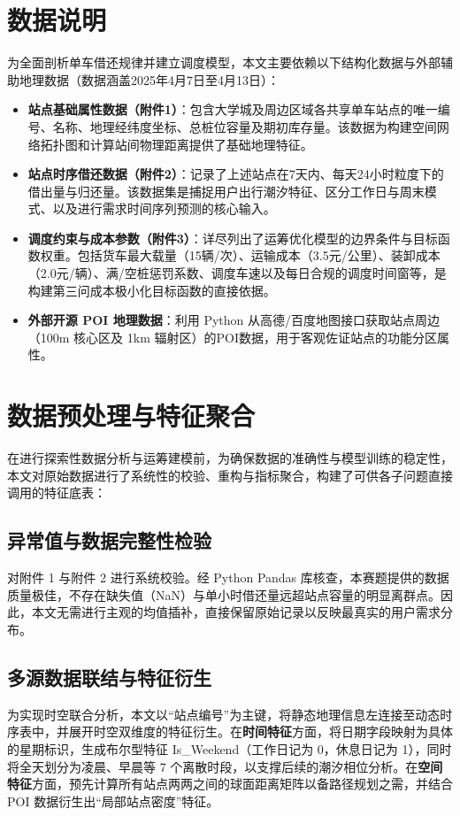 \documentclass[a4paper, 12pt]{ctexart}
\begin{document}
\section{数据说明} 
为全面剖析单车借还规律并建立调度模型，本文主要依赖以下结构化数据与外部辅助地理数据（数据涵盖2025年4月7日至4月13日）：
\begin{itemize}
    \item \textbf{站点基础属性数据（附件1）}：包含大学城及周边区域各共享单车站点的唯一编号、名称、地理经纬度坐标、总桩位容量及期初库存量。该数据为构建空间网络拓扑图和计算站间物理距离提供了基础地理特征。
    \item \textbf{站点时序借还数据（附件2）}：记录了上述站点在7天内、每天24小时粒度下的借出量与归还量。该数据集是捕捉用户出行潮汐特征、区分工作日与周末模式、以及进行需求时间序列预测的核心输入。
    \item \textbf{调度约束与成本参数（附件3）}：详尽列出了运筹优化模型的边界条件与目标函数权重。包括货车最大载量（15辆/次）、运输成本（3.5元/公里）、装卸成本（2.0元/辆）、满/空桩惩罚系数、调度车速以及每日合规的调度时间窗等，是构建第三问成本极小化目标函数的直接依据。
    \item \textbf{外部开源 POI 地理数据}：利用 Python 从高德/百度地图接口获取站点周边（100m 核心区及 1km 辐射区）的POI数据，用于客观佐证站点的功能分区属性。
\end{itemize}

\section{数据预处理与特征聚合}
在进行探索性数据分析与运筹建模前，为确保数据的准确性与模型训练的稳定性，本文对原始数据进行了系统性的校验、重构与指标聚合，构建了可供各子问题直接调用的特征底表：

\subsection{异常值与数据完整性检验}
对附件 1 与附件 2 进行系统校验。经 Python Pandas 库核查，本赛题提供的数据质量极佳，不存在缺失值（NaN）与单小时借还量远超站点容量的明显离群点。因此，本文无需进行主观的均值插补，直接保留原始记录以反映最真实的用户需求分布。

\subsection{多源数据联结与特征衍生}
为实现时空联合分析，本文以“站点编号”为主键，将静态地理信息左连接至动态时序表中，并展开时空双维度的特征衍生。在\textbf{时间特征}方面，将日期字段映射为具体的星期标识，生成布尔型特征 Is\_Weekend（工作日记为 0，休息日记为 1），同时将全天划分为凌晨、早晨等 7 个离散时段，以支撑后续的潮汐相位分析。在\textbf{空间特征}方面，预先计算所有站点两两之间的球面距离矩阵以备路径规划之需，并结合 POI 数据衍生出“局部站点密度”特征。
\end{document}
